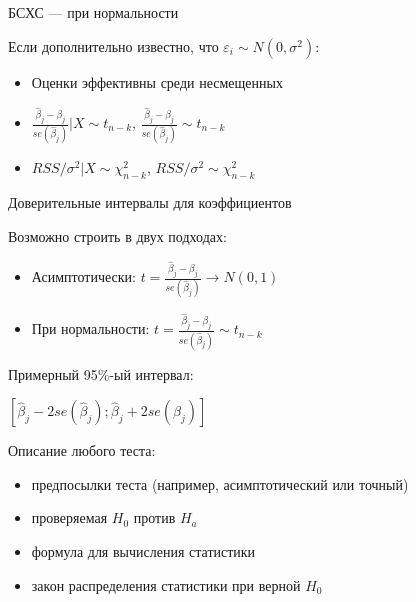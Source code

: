\documentclass[ignorenonframetext,]{beamer}
\begin{document}
\begin{frame}{БСХС --- при нормальности}

Если дополнительно известно, что $\varepsilon_i \sim N(0, \sigma^2)$:

\begin{itemize}
\itemsep1pt\parskip0pt
\item
  Оценки эффективны среди несмещенных
\item
  $\frac{\hat{\beta}_j-\beta_j}{se(\hat{\beta}_j)}|X \sim t_{n-k}$,
  $\frac{\hat{\beta}_j-\beta_j}{se(\hat{\beta}_j)}\sim t_{n-k}$
\item
  $RSS/\sigma^2 |X \sim \chi^2_{n-k}$, $RSS/\sigma^2 \sim \chi^2_{n-k}$
\end{itemize}

\end{frame}

\begin{frame}{Доверительные интервалы для коэффициентов}

Возможно строить в двух подходах:

\begin{itemize}
\item
  Асимптотически:
  $t=\frac{\hat{\beta}_j-\beta_j}{se(\hat{\beta}_j)} \to N(0,1)$
\item
  При нормальности:
  $t=\frac{\hat{\beta}_j-\beta_j}{se(\hat{\beta}_j)} \sim t_{n-k}$
\end{itemize}

Примерный 95\%-ый интервал:

$[\hat{\beta}_j-2se(\hat{\beta}_j);\hat{\beta}_j+2se(\hat{\beta}_j) ]$

\end{frame}

\begin{frame}{Описание любого теста:}

\begin{itemize}
\itemsep1pt\parskip0pt
\item
  предпосылки теста (например, асимптотический или точный)
\item
  проверяемая $H_0$ против $H_a$
\item
  формула для вычисления статистики
\item
  закон распределения статистики при верной $H_0$
\end{itemize}

\end{frame}
\end{document}
